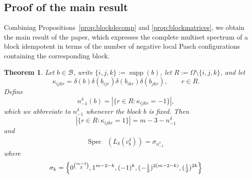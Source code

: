 \documentclass[times,11pt,reqno]{amsproc}
\newtheorem{theorem}{Theorem}[section]
\theoremstyle{definition}
\numberwithin{equation}{section}
\DeclareMathOperator{\supp}{supp}
\DeclareMathOperator{\Spec}{Spec}
\begin{document}
\subsection{Proof of the main result}\label{sec:localpasch}

Combining Propositions~\ref{prop:blockdecomp} and \ref{prop:blockmatrices}, we obtain the main result of the paper, which expresses the complete multiset spectrum of a block idempotent in terms of the number of negative local Pasch configurations containing the corresponding block.

\begin{theorem}\label{thm:localpaschspectrum}
Let $b\in\mathcal B$, write $\{i,j,k\}:=\supp(b)$, let $R:=\Omega\setminus\{i,j,k\}$, and let
\begin{equation}\label{kjkr}
\kappa_{ijkr}
=
\delta(b)
\delta(b_{ijr})
\delta(b_{ikr})
\delta(b_{jkr}),
\qquad
r\in R.
\end{equation}
Define
\begin{equation}\label{nminusone1}
n^{\delta}_{-1}(b)
=
|\{r\in R:\kappa_{ijkr}=-1\}|,
\end{equation}
which we abbreviate to $n^{\delta}_{-1}$ whenever the block $b$ is
fixed. Then
\begin{equation}\label{nplusrelation}
|\{r\in R:\kappa_{ijkr}=1\}| = m-3-n^{\delta}_{-1}
\end{equation}
and
\begin{equation}\label{localspectrumformula}
\begin{aligned}
\Spec&(L_\delta(c_b^\delta))=\sigma_{n^{\delta}_{-1}}
\end{aligned}
\end{equation}
where
\begin{equation}\label{sigmanot}
\sigma_k
=
\Bigl\{
0^{\binom{m-3}{2}},
1^{m-2-k},
(-1)^k,
(-\tfrac12)^{2(m-2-k)},
(\tfrac12)^{2k}
\Bigr\}
\end{equation}
\end{theorem}
\end{document}
